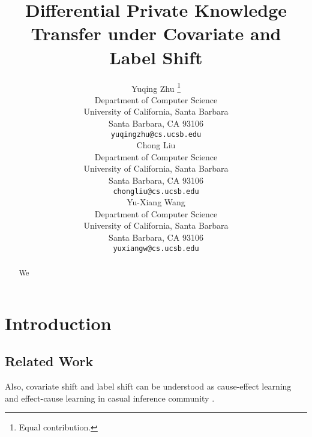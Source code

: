 \documentclass{article}
\title{Differential Private Knowledge Transfer  under Covariate and Label Shift}
\author{
	Yuqing Zhu \thanks{Equal contribution.}\\
	Department of Computer Science \\
	University of California, Santa Barbara \\
	Santa Barbara, CA 93106 \\
	\texttt{yuqingzhu@cs.ucsb.edu} \\
	\And
	Chong Liu \printfnsymbol{1} \\
	Department of Computer Science \\
	University of California, Santa Barbara \\
	Santa Barbara, CA 93106 \\
	\texttt{chongliu@cs.ucsb.edu} \\
	\And
	Yu-Xiang Wang \\
	Department of Computer Science \\
	University of California, Santa Barbara \\
	Santa Barbara, CA 93106 \\
	\texttt{yuxiangw@cs.ucsb.edu} \\
}
\theoremstyle{definition}
\begin{document}
\maketitle

\begin{abstract}
    We
\end{abstract}

\section{Introduction}







\subsection{Related Work}
\cite{papernot-iclr18-scalable}
\cite{bassily-nips18-model}
\cite{papernot-iclr17-semi}

\cite{dwork-14-the}

\cite{lipton-icml18-detecting}
\cite{bickel-jmlr09-discriminative}
\cite{mansour-colt09-domain}
\cite{cortes-nips10-learning}
Also, covariate shift and label shift can be understood as cause-effect learning and effect-cause learning in casual inference community \cite{scholkopf-icml12-on}.
\cite{zhang-icml13-domain}
\cite{gretton-chapter-covariate}
\cite{azizzadenesheli-iclr18-regularized}
\end{document}
